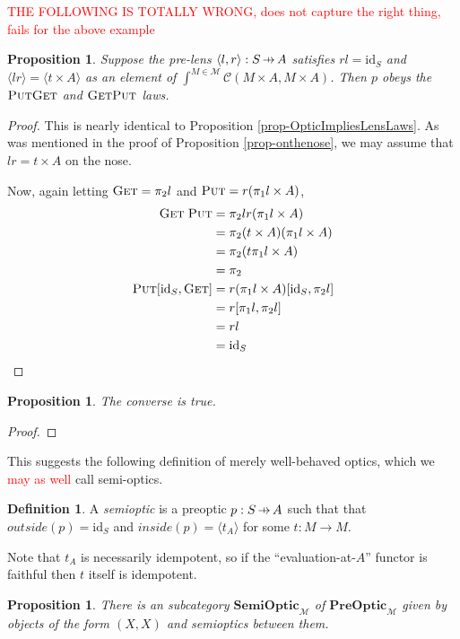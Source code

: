 \documentclass[11pt,a4paper]{article}
\theoremstyle{plain}
\newtheorem{proposition}[theorem]{Proposition}
\theoremstyle{definition}
\newtheorem{definition}[theorem]{Definition}
\newcommand{\C}{\mathscr{C}}
\newcommand{\M}{\mathscr{M}}
\newcommand{\PreOptic}{\mathbf{PreOptic}}
\newcommand{\SemiOptic}{\mathbf{SemiOptic}}
\newcommand{\id}{\mathrm{id}}
\newcommand{\fget}{\textsc{Get}}
\newcommand{\fput}{\textsc{Put}}
\newcommand{\hto}{\ensuremath{\,\mathaccent\shortmid\rightarrow\,}}
\newcommand{\todo}[1]{\textcolor{red}{\small #1}}
\begin{document}
\todo{THE FOLLOWING IS TOTALLY WRONG, does not capture the right thing, fails for the above example}

\begin{proposition}
Suppose the pre-lens $\langle l, r \rangle : S \hto A$ satisfies $rl = \id_S$ and $\langle lr \rangle = \langle t \times A \rangle$ as an element of $\int^{M \in \M} \C(M \times A, M \times A)$. Then $p$ obeys the $\fput\fget$ and $\fget\fput$ laws.
\end{proposition}
\begin{proof}
This is nearly identical to Proposition \ref{prop-OpticImpliesLensLaws}. As was mentioned in the proof of Proposition \ref{prop-onthenose}, we may assume that $lr = t \times A$ on the nose.

Now, again letting $\fget = \pi_2 l$ and $\fput = r (\pi_1 l \times A)$,
\begin{align*}
\fget \; \fput 
&= \pi_2 l r (\pi_1 l \times A) \\
&= \pi_2 (t \times A) (\pi_1 l \times A) \\
&= \pi_2 (t \pi_1 l \times A) \\
&= \pi_2 \\
\fput [\id_S, \fget] 
&= r (\pi_1 l \times A) [\id_S, \pi_2 l] \\
&= r [\pi_1 l, \pi_2 l] \\
&= rl \\
&= \id_S
\end{align*}
\end{proof}

\begin{proposition}
The converse is true.
\end{proposition}
\begin{proof}

\end{proof}

This suggests the following definition of merely well-behaved optics, which we \todo{may as well} call semi-optics.

\begin{definition}
A \emph{semioptic} is a preoptic $p : S \hto A$ such that that $outside(p) = \id_S$ and $inside(p) = \langle t_A \rangle$ for some $t : M \to M$.
\end{definition}

Note that $t_A$ is necessarily idempotent, so if the ``evaluation-at-$A$'' functor is faithful then $t$ itself is idempotent.

\begin{proposition}
There is an subcategory $\SemiOptic_\M$ of $\PreOptic_\M$ given by objects of the form $(X, X)$ and semioptics between them.
\end{proposition}
\end{document}
